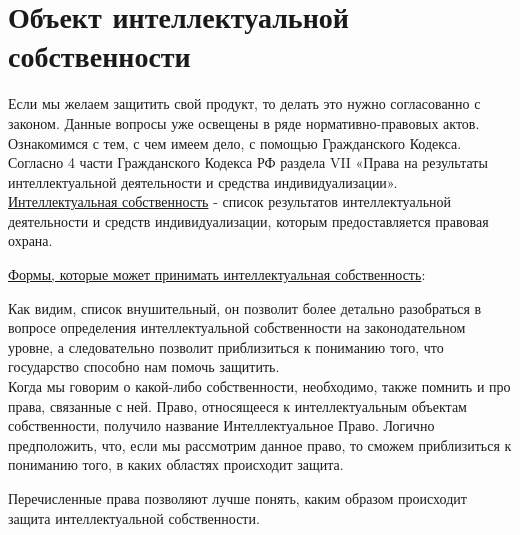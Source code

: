 \section{Объект интеллектуальной собственности}
Если мы желаем защитить свой продукт,
	то делать это нужно согласованно с законом.
Данные вопросы уже освещены в ряде нормативно-правовых актов.
Ознакомимся с тем,
	с чем имеем дело,
	с помощью Гражданского Кодекса.\\

Согласно 4 части Гражданского Кодекса РФ
	раздела VII «Права на результаты интеллектуальной деятельности и средства индивидуализации».\cite{GKRF}\\

\underline{Интеллектуальная собственность} - список результатов интеллектуальной деятельности и средств индивидуализации,
	которым предоставляется правовая охрана.

\newpage
\underline{Формы, которые может принимать интеллектуальная собственность}:


Как видим, список внушительный,
	он позволит более детально разобраться в вопросе определения интеллектуальной собственности на законодательном уровне,
		а следовательно позволит приблизиться к пониманию того,
			что государство способно нам помочь защитить.
\\

Когда мы говорим о какой-либо собственности,
	необходимо, также помнить и про права,
		связанные с ней.
Право,
	относящееся к интеллектуальным объектам собственности,
	получило название Интеллектуальное Право.
Логично предположить, что,
	если мы рассмотрим данное право,
	то сможем приблизиться к пониманию того,
		в каких областях происходит защита.

\newpage


Перечисленные права позволяют лучше понять,
	каким образом происходит защита интеллектуальной собственности.
